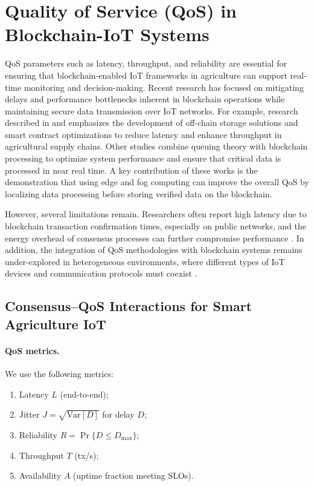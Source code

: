 \documentclass[12pt,onecolumn]{IEEEtran} %
\begin{document}
\section{Quality of Service (QoS) in Blockchain-IoT Systems}
QoS parameters such as latency, throughput, and reliability are essential for ensuring that blockchain-enabled IoT frameworks in agriculture can support real-time monitoring and decision-making. Recent research has focused on mitigating delays and performance bottlenecks inherent in blockchain operations while maintaining secure data transmission over IoT networks. For example, research described in \cite{ellahi2023blockchainbasedframeworksfor} and \cite{ellahi2023blockchainbasedframeworksfor} emphasizes the development of off-chain storage solutions and smart contract optimizations to reduce latency and enhance throughput in agricultural supply chains. Other studies \cite{khan2022ablockchainand, sizan2505asecuredtriad} combine queuing theory with blockchain processing to optimize system performance and ensure that critical data is processed in near real time. A key contribution of these works is the demonstration that using edge and fog computing can improve the overall QoS by localizing data processing before storing verified data on the blockchain.

However, several limitations remain. Researchers often report high latency due to blockchain transaction confirmation times, especially on public networks, and the energy overhead of consensus processes can further compromise performance \cite{saha2022blockchainchangingthe, ali2022blockchainenabledarchitecture}. In addition, the integration of QoS methodologies with blockchain systems remains under-explored in heterogeneous environments, where different types of IoT devices and communication protocols must coexist \cite{sakthivel2024enhancingtransparencyand, sajja2023towardsapplicabilityof}.
\subsection{Consensus--QoS Interactions for Smart Agriculture IoT}
\label{sec:consensus-qos}

\paragraph{QoS metrics.}
We use the following metrics:
\begin{enumerate}[label=\arabic*., leftmargin=*, itemsep=0.2em]
    \item Latency $L$ (end-to-end);
    \item Jitter $J=\sqrt{\mathrm{Var}[D]}$ for delay $D$;
    \item Reliability $R=\Pr\{D\le D_{\max}\}$;
    \item Throughput $T$ (tx/s);
    \item Availability $A$ (uptime fraction meeting SLOs).
\end{enumerate}
\end{document}
